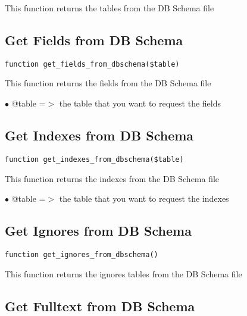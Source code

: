 \documentclass[a4paper]{book}
\begin{document}
This function returns the tables from the DB Schema file

\hypertarget{toc91}{}
\subsection{Get Fields from DB Schema}

\begin{lstlisting}
function get_fields_from_dbschema($table)
\end{lstlisting}

This function returns the fields from the DB Schema file

\begin{compactitem}
\item[\color{myblue}$\bullet$] @table =$>$ the table that you want to request the fields
\end{compactitem}

\hypertarget{toc92}{}
\subsection{Get Indexes from DB Schema}

\begin{lstlisting}
function get_indexes_from_dbschema($table)
\end{lstlisting}

This function returns the indexes from the DB Schema file

\begin{compactitem}
\item[\color{myblue}$\bullet$] @table =$>$ the table that you want to request the indexes
\end{compactitem}

\hypertarget{toc93}{}
\subsection{Get Ignores from DB Schema}

\begin{lstlisting}
function get_ignores_from_dbschema()
\end{lstlisting}

This function returns the ignores tables from the DB Schema file

\hypertarget{toc94}{}
\subsection{Get Fulltext from DB Schema}
\end{document}
